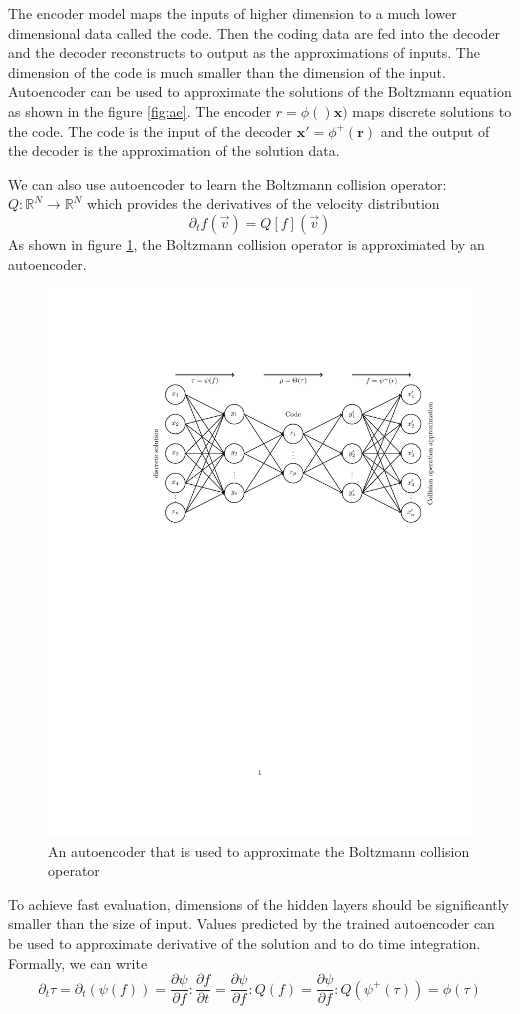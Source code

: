 \documentclass{article}
\begin{document}
The encoder model maps the inputs of higher dimension to a much lower dimensional data called the code. Then the coding data are fed into the decoder and the decoder reconstructs to output as the approximations of  inputs. The dimension of the code is much smaller than the dimension of the input. Autoencoder can be used to approximate the solutions of the Boltzmann equation as shown in the figure \ref{fig:ae}. The encoder $r = \phi()\mathbf{x})$ maps discrete solutions to the code. The code is the input of the decoder $\mathbf{x'}=\phi^+(\mathbf{r})$ and the output of the decoder is the approximation of the solution data.

We can also use autoencoder to learn the Boltzmann collision operator: $Q:\mathbb{R}^N\rightarrow\mathbb{R}^N$ which provides the derivatives of the velocity distribution
\begin{equation}
\partial_t{f(\vec{v})} = Q[f](\vec{v})
\end{equation}
As shown in figure \ref{fig:ColOpAE}, the Boltzmann collision operator is approximated by an autoencoder.
\begin{figure}[h]
	\centering
	\includegraphics[width=.75\textwidth]{ColOpAE.pdf}
	\caption{An autoencoder that is used to approximate the Boltzmann collision operator}
	\label{fig:ColOpAE}
\end{figure}
\noindent To achieve fast evaluation, dimensions of the hidden layers should be significantly smaller than the size of input. Values predicted by the trained autoencoder can be used to approximate derivative of the solution and to do time integration. Formally, we can write
\begin{equation}
\partial_t{\tau} = \partial_t(\psi(f)) = \frac{\partial\psi}{\partial f}:\frac{\partial f}{\partial t} = \frac{\partial\psi}{\partial f}:Q(f) = \frac{\partial\psi}{\partial f}:Q(\psi^+(\tau)) = \phi(\tau)
\end{equation}
\end{document}
